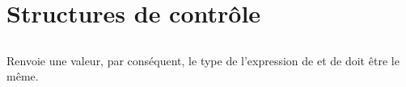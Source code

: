 \section{ Structures de contrôle}

\subsection{ }

Renvoie une valeur, par conséquent, le type de l'expression de  et de  doit être le même.

\subsection{ }

